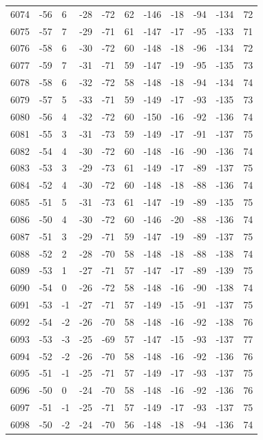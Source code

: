 \begin{table}[H]
\begin{tabular}{lllllllllll}
6074 & -56 & 6 & -28 & -72 & 62 & -146 & -18 & -94 & -134 & 72 \\
6075 & -57 & 7 & -29 & -71 & 61 & -147 & -17 & -95 & -133 & 71 \\
6076 & -58 & 6 & -30 & -72 & 60 & -148 & -18 & -96 & -134 & 72 \\
6077 & -59 & 7 & -31 & -71 & 59 & -147 & -19 & -95 & -135 & 73 \\
6078 & -58 & 6 & -32 & -72 & 58 & -148 & -18 & -94 & -134 & 74 \\
6079 & -57 & 5 & -33 & -71 & 59 & -149 & -17 & -93 & -135 & 73 \\
6080 & -56 & 4 & -32 & -72 & 60 & -150 & -16 & -92 & -136 & 74 \\
6081 & -55 & 3 & -31 & -73 & 59 & -149 & -17 & -91 & -137 & 75 \\
6082 & -54 & 4 & -30 & -72 & 60 & -148 & -16 & -90 & -136 & 74 \\
6083 & -53 & 3 & -29 & -73 & 61 & -149 & -17 & -89 & -137 & 75 \\
6084 & -52 & 4 & -30 & -72 & 60 & -148 & -18 & -88 & -136 & 74 \\
6085 & -51 & 5 & -31 & -73 & 61 & -147 & -19 & -89 & -135 & 75 \\
6086 & -50 & 4 & -30 & -72 & 60 & -146 & -20 & -88 & -136 & 74 \\
6087 & -51 & 3 & -29 & -71 & 59 & -147 & -19 & -89 & -137 & 75 \\
6088 & -52 & 2 & -28 & -70 & 58 & -148 & -18 & -88 & -138 & 74 \\
6089 & -53 & 1 & -27 & -71 & 57 & -147 & -17 & -89 & -139 & 75 \\
6090 & -54 & 0 & -26 & -72 & 58 & -148 & -16 & -90 & -138 & 74 \\
6091 & -53 & -1 & -27 & -71 & 57 & -149 & -15 & -91 & -137 & 75 \\
6092 & -54 & -2 & -26 & -70 & 58 & -148 & -16 & -92 & -138 & 76 \\
6093 & -53 & -3 & -25 & -69 & 57 & -147 & -15 & -93 & -137 & 77 \\
6094 & -52 & -2 & -26 & -70 & 58 & -148 & -16 & -92 & -136 & 76 \\
6095 & -51 & -1 & -25 & -71 & 57 & -149 & -17 & -93 & -137 & 75 \\
6096 & -50 & 0 & -24 & -70 & 58 & -148 & -16 & -92 & -136 & 76 \\
6097 & -51 & -1 & -25 & -71 & 57 & -149 & -17 & -93 & -137 & 75 \\
6098 & -50 & -2 & -24 & -70 & 56 & -148 & -18 & -94 & -136 & 74 \\

\end{tabular}
\end{table}
